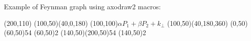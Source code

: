 \documentclass{article}
\begin{document}
Example of Feynman graph using axodraw2 macros:
\begin{center}
\begin{axopicture}(200,110)
\Arc[arrow](100,50)(40,0,180)
\Text(100,100){$\alpha P_1 + \beta P_2 + k_\perp$}
\Arc[arrow](100,50)(40,180,360)
\Gluon(0,50)(60,50){5}{4}
\Vertex(60,50){2}
\Gluon(140,50)(200,50){5}{4}
\Vertex(140,50){2}
\end{axopicture}
\end{center}
\end{document}
